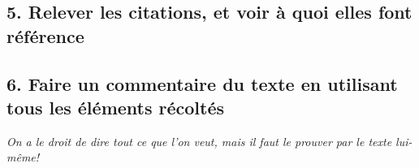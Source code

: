 \subsection*{5. Relever les citations, et voir à quoi elles font référence}
\subsection*{6. Faire un commentaire du texte en utilisant tous les éléments récoltés}
\textit{On a le droit de dire tout ce que l'on veut, mais il faut le prouver par le texte lui-même!}